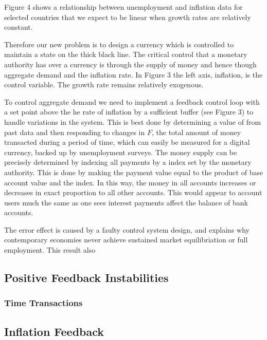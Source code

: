 Figure 4 shows a relationship between 
unemployment and inflation data for selected countries that we expect to be linear when growth rates
are relatively constant.

Therefore our new problem is to design a currency which is controlled to maintain a
state on the thick black line. The critical control that a monetary authority has over a currency is
through the supply of money and hence though aggregate demand and the inflation rate. In Figure 3
the left axis, inflation, is the control variable. The growth rate remains relatively exogenous.

To control aggregate demand we need to implement a feedback control loop with a set point above the
he rate of inflation by a sufficient buffer (see Figure 3) to handle variations in the system. This
is best done by determining a value of from past data and then responding to changes in $F$, the
total amount of money transacted during a period of time, which can easily be measured for a digital
currency, backed up by unemployment surveys. The money supply can be precisely determined by
indexing all payments by a index set by the monetary authority. This is done by making the payment
value equal to the product of base account value and the index. In this way, the money in all
accounts increases or decreases in exact proportion to all other accounts. This would appear to
account users much the same as one sees interest payments affect the balance of bank accounts.

The error effect is caused by a faulty control system design, and explains why contemporary
economies never achieve sustained market equilibriation or full employment. This result also

\subsection{Positive Feedback Instabilities}

\subsubsection{Time Transactions}

\subsection{Inflation Feedback}

